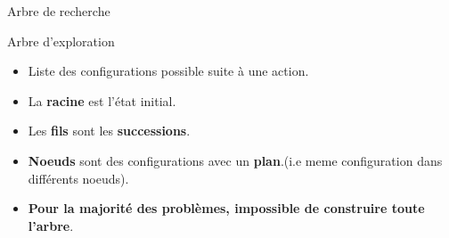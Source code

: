 \documentclass{beamer}
\begin{document}
\begin{frame}[t]{Arbre de recherche}
\begin{figure}[htpb]
\begin{center}
\end{center}
\end{figure}

\begin{block}{Arbre d'exploration}
  \begin{itemize}
    \footnotesize
  \item<2-> Liste des configurations possible suite à une \alert{action}.
  \item<3-> La \alert{\textbf{racine}} est l'état initial. 
  \item<4-> Les \alert{\textbf{fils}} sont les \textbf{successions}.
\item <5-> \alert{ \textbf{Noeuds}} sont des configurations avec un
  \textbf{plan}.(i.e meme configuration dans différents noeuds).  
\item<6-> \textbf{\alert{Pour la majorité des problèmes, impossible de
    construire toute
l'arbre}}.
  \end{itemize} 
\end{block}
\end{frame}
\end{document}
